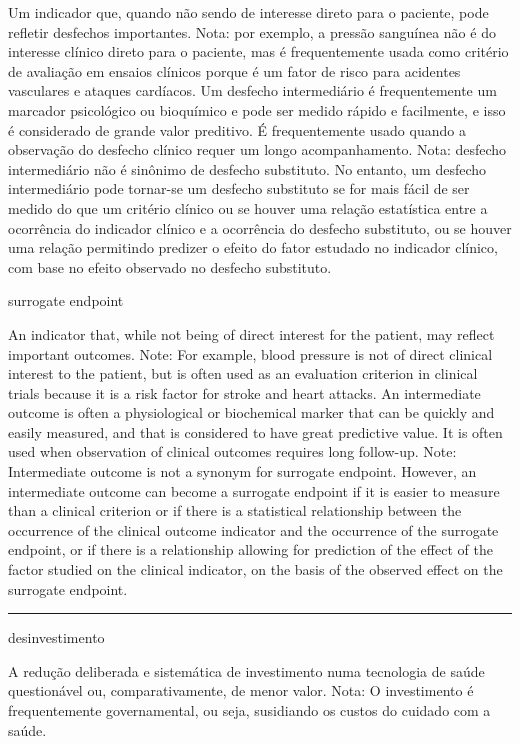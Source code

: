 \documentclass[
  openany]{book}
\begin{document}
Um indicador que, quando não sendo de interesse direto para o paciente, pode refletir desfechos importantes. Nota: por exemplo, a pressão sanguínea não é do interesse clínico direto para o paciente, mas é frequentemente usada como critério de avaliação em ensaios clínicos porque é um fator de risco para acidentes vasculares e ataques cardíacos. Um desfecho intermediário é frequentemente um marcador psicológico ou bioquímico e pode ser medido rápido e facilmente, e isso é considerado de grande valor preditivo. É frequentemente usado quando a observação do desfecho clínico requer um longo acompanhamento. Nota: desfecho intermediário não é sinônimo de desfecho substituto. No entanto, um desfecho intermediário pode tornar-se um desfecho substituto se for mais fácil de ser medido do que um critério clínico ou se houver uma relação estatística entre a ocorrência do indicador clínico e a ocorrência do desfecho substituto, ou se houver uma relação permitindo predizer o efeito do fator estudado no indicador clínico, com base no efeito observado no desfecho substituto.

surrogate endpoint

An indicator that, while not being of direct interest for the patient, may reflect important outcomes. Note: For example, blood pressure is not of direct clinical interest to the patient, but is often used as an evaluation criterion in clinical trials because it is a risk factor for stroke and heart attacks. An intermediate outcome is often a physiological or biochemical marker that can be quickly and easily measured, and that is considered to have great predictive value. It is often used when observation of clinical outcomes requires long follow-up. Note: Intermediate outcome is not a synonym for surrogate endpoint. However, an intermediate outcome can become a surrogate endpoint if it is easier to measure than a clinical criterion or if there is a statistical relationship between the occurrence of the clinical outcome indicator and the occurrence of the surrogate endpoint, or if there is a relationship allowing for prediction of the effect of the factor studied on the clinical indicator, on the basis of the observed effect on the surrogate endpoint.

\begin{center}\rule{0.5\linewidth}{0.5pt}\end{center}

desinvestimento

A redução deliberada e sistemática de investimento numa tecnologia de saúde questionável ou, comparativamente, de menor valor. Nota: O investimento é frequentemente governamental, ou seja, susidiando os custos do cuidado com a saúde.
\end{document}
